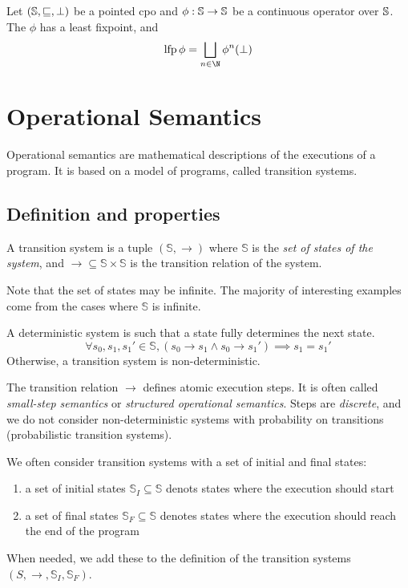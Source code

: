 \documentclass[toc]{../cs-classes/cs-classes}
\DeclareMathOperator{\lfp}{lfp}
\begin{document}
\begin{theorem}[Kleene's]
    Let $(\S, \sqsubseteq, \bot)$ be a pointed cpo and $\phi:\S\to\S$ be a continuous operator over $\S$. The $\phi$ has a least fixpoint, and
    \begin{equation*}
        \lfp\phi = \bigsqcup_{n\in\N}\phi^n(\bot)
    \end{equation*}
\end{theorem}

\renewcommand{\S}{\mathbb{S}}
\newcommand{\B}{\mathbb{B}}

\section{Operational Semantics}
Operational semantics are mathematical descriptions of the executions of a program. It is based on a model of programs, called transition systems.

\subsection{Definition and properties}
\begin{definition}
    A transition system is a tuple $(\S, \to)$ where $\S$ is the \emph{set of states of the system}, and $\to\subseteq\S\times\S$ is the transition relation of the system.
\end{definition}
Note that the set of states may be infinite. The majority of interesting examples come from the cases where $\S$ is infinite.

\begin{definition}
    A deterministic system is such that a state fully determines the next state.
    \begin{equation*}
        \forall s_0, s_1, s_1'\in\S, (s_0\to s_1 \land s_0\to s_1') \implies s_1 = s_1'
    \end{equation*}
    Otherwise, a transition system is non-deterministic.
\end{definition}

The transition relation $\to$ defines atomic execution steps. It is often called \emph{small-step semantics} or \emph{structured operational semantics}. Steps are \emph{discrete}, and we do not consider non-deterministic systems with probability on transitions (probabilistic transition systems).

\begin{definition}
    We often consider transition systems with a set of initial and final states:
    \begin{enumerate}
        \item a set of initial states $\S_I\subseteq\S$ denots states where the execution should start
        \item a set of final states $\S_F\subseteq\S$ denotes states where the execution should reach the end of the program
    \end{enumerate}
    When needed, we add these to the definition of the transition systems $(S, \to, \S_I, \S_F)$.
\end{definition}
\end{document}
